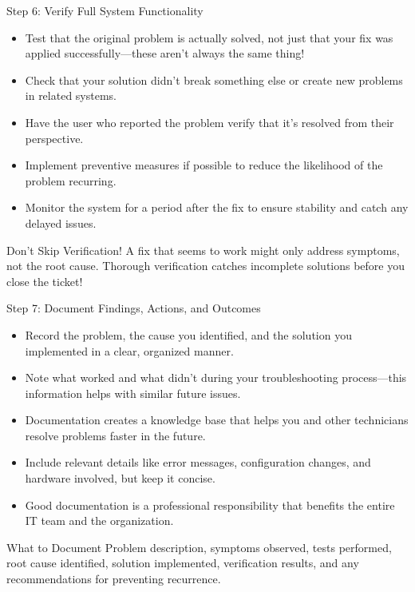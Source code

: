 \documentclass[aspectratio=169]{beamer}
\begin{document}
\begin{frame}{Step 6: Verify Full System Functionality}

\begin{itemize}
    \item Test that the original problem is actually solved, not just that your fix was applied successfully—these aren't always the same thing!
    \item Check that your solution didn't break something else or create new problems in related systems.
    \item Have the user who reported the problem verify that it's resolved from their perspective.
    \item Implement preventive measures if possible to reduce the likelihood of the problem recurring.
    \item Monitor the system for a period after the fix to ensure stability and catch any delayed issues.
\end{itemize}

\vspace{0.3cm}

\begin{alertblock}{Don't Skip Verification!}
A fix that seems to work might only address symptoms, not the root cause. Thorough verification catches incomplete solutions before you close the ticket!
\end{alertblock}

\end{frame}

\begin{frame}{Step 7: Document Findings, Actions, and Outcomes}

\begin{itemize}
    \item Record the problem, the cause you identified, and the solution you implemented in a clear, organized manner.
    \item Note what worked and what didn't during your troubleshooting process—this information helps with similar future issues.
    \item Documentation creates a knowledge base that helps you and other technicians resolve problems faster in the future.
    \item Include relevant details like error messages, configuration changes, and hardware involved, but keep it concise.
    \item Good documentation is a professional responsibility that benefits the entire IT team and the organization.
\end{itemize}

\vspace{0.3cm}

\begin{block}{What to Document}
Problem description, symptoms observed, tests performed, root cause identified, solution implemented, verification results, and any recommendations for preventing recurrence.
\end{block}

\end{frame}
\end{document}
